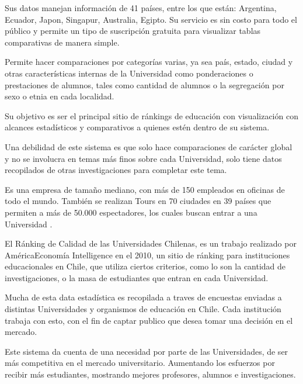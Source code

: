 \documentclass[a4paper,12pt,openany,oneside]{book}
\begin{document}
Sus datos manejan información de 41 países, entre los que están: Argentina, Ecuador, Japon, Singapur, Australia, Egipto. Su servicio es sin costo para todo el público y permite un tipo de suscripción gratuita para visualizar tablas comparativas de manera simple.

Permite hacer comparaciones por categorías varias, ya sea país, estado, ciudad y otras características internas de la Universidad como ponderaciones o prestaciones de alumnos, tales como cantidad de alumnos o la segregación por sexo o etnia en cada localidad.

Su objetivo es ser el principal sitio de ránkings de educación con visualización con alcances estadísticos y comparativos a quienes estén dentro de su sistema.

Una debilidad de este sistema es que solo hace comparaciones de carácter global y no se involucra en temas más finos sobre cada Universidad, solo tiene datos recopilados de otras investigaciones para completar este tema.

Es una empresa de tamaño mediano, con más de 150 empleados en oficinas de todo el mundo. También se realizan Tours en 70 ciudades en 39 países que permiten a más de 50.000 espectadores, los cuales buscan entrar a una Universidad  \cite{data2}.

El Ránking de Calidad de las Universidades Chilenas, es un trabajo realizado por AméricaEconomía Intelligence en el 2010, un sitio de ránking para instituciones educacionales en Chile, que utiliza ciertos criterios, como lo son la cantidad de investigaciones, o la masa de estudiantes que entran en cada Universidad.


Mucha de esta data estadística es recopilada a traves de encuestas enviadas a distintas Universidades y organismos de educación en Chile. Cada institución trabaja con esto, con el fin de captar publico que desea tomar una decisión en el mercado.

Este sistema da cuenta de una necesidad por parte de las Universidades, de ser más competitiva en el mercado universitario. Aumentando los esfuerzos por recibir más estudiantes, mostrando mejores profesores, alumnos e investigaciones.
\end{document}
